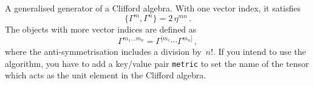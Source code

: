 
A generalised generator of a Clifford algebra. With one vector index,
  it satisfies
\begin{equation}
\{ \Gamma^m, \Gamma^n \} = 2\,\eta^{mn}\,.
\end{equation}
The objects with more vector indices are defined as
\begin{equation}
\Gamma^{m_1\ldots m_n} = \Gamma^{[m_1}\cdots \Gamma^{m_n]}\,,
\end{equation}
where the anti-symmetrisation includes a division by~$n!$.
If you intend to use the  algorithm, you have to add a
key/value pair \verb|metric| to set the name of the tensor which acts
as the unit element in the Clifford algebra.
